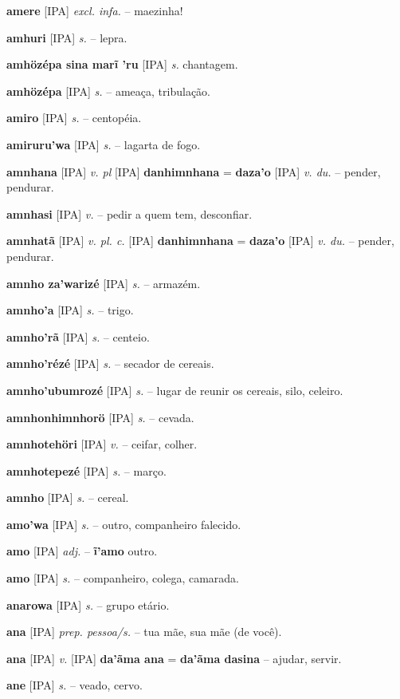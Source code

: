 \textbf{amere} [IPA] \textit{excl. infa.} -- maezinha!

\textbf{amhuri} [IPA] \textit{s.} -- lepra.

\textbf{amhözépa sina marĩ 'ru} [IPA] \textit{s.} chantagem.

\textbf{amhözépa} [IPA] \textit{s.} -- ameaça, tribulação.

\textbf{amiro} [IPA] \textit{s.} -- centopéia.

\textbf{amiruru'wa} [IPA] \textit{s.} -- lagarta de fogo.

\textbf{amnhana} [IPA] \textit{v. pl} [IPA] \textbf{danhimnhana} = \textbf{daza'o} [IPA] \textit{v. du.} -- pender, pendurar.

\textbf{amnhasi} [IPA] \textit{v.} -- pedir a quem tem, desconfiar.

\textbf{amnhatã} [IPA] \textit{v. pl. c.} [IPA] \textbf{danhimnhana} = \textbf{daza'o} [IPA] \textit{v. du.} -- pender, pendurar.

\textbf{amnho za'warizé} [IPA] \textit{s.} -- armazém.

\textbf{amnho'a} [IPA] \textit{s.} -- trigo.

\textbf{amnho'rã} [IPA] \textit{s.} -- centeio.

\textbf{amnho'rézé} [IPA] \textit{s.} -- secador de cereais.

\textbf{amnho'ubumrozé} [IPA] \textit{s.} -- lugar de reunir os cereais, silo, celeiro.

\textbf{amnhonhimnhorö} [IPA] \textit{s.} -- cevada.

\textbf{amnhotehöri} [IPA] \textit{v.} -- ceifar, colher.

\textbf{amnhotepezé} [IPA] \textit{s.} -- março.

\textbf{amnho} [IPA] \textit{s.} -- cereal.

\textbf{amo'wa} [IPA] \textit{s.} -- outro, companheiro falecido.

\textbf{amo} [IPA] \textit{adj.} -- \textbf{ĩ'amo} outro.

\textbf{amo} [IPA] \textit{s.} -- companheiro, colega, camarada.

\textbf{anarowa} [IPA] \textit{s.} -- grupo etário.

\textbf{ana} [IPA] \textit{prep. pessoa/s.} -- tua mãe, sua mãe (de você).

\textbf{ana} [IPA] \textit{v.} [IPA] \textbf{da'ãma ana} = \textbf{da'ãma dasina} -- ajudar, servir.

\textbf{ane} [IPA] \textit{s.} -- veado, cervo.

